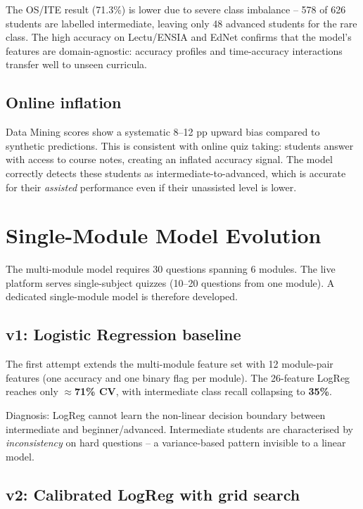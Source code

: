 \documentclass[12pt,a4paper]{article}
\begin{document}
The OS/ITE result (71.3\%) is lower due to severe class imbalance -- 578 of 626 students
are labelled intermediate, leaving only 48 advanced students for the rare class. The
high accuracy on Lectu/ENSIA and EdNet confirms that the model's features are
domain-agnostic: accuracy profiles and time-accuracy interactions transfer well
to unseen curricula.

\subsection{Online inflation}

Data Mining scores show a systematic 8--12 pp upward bias compared to synthetic
predictions. This is consistent with online quiz taking: students answer with access
to course notes, creating an inflated accuracy signal. The model correctly detects
these students as intermediate-to-advanced, which is accurate for their
\emph{assisted} performance even if their unassisted level is lower.

\section{Single-Module Model Evolution}
\label{sec:singlemodule}

The multi-module model requires 30 questions spanning 6 modules.
The live platform serves single-subject quizzes (10--20 questions from one module).
A dedicated single-module model is therefore developed.

\subsection{v1: Logistic Regression baseline}

The first attempt extends the multi-module feature set with 12 module-pair features
(one accuracy and one binary flag per module). The 26-feature LogReg reaches only
\textbf{$\approx$71\% CV}, with intermediate class recall collapsing to \textbf{35\%}.

Diagnosis: LogReg cannot learn the non-linear decision boundary between intermediate
and beginner/advanced. Intermediate students are characterised by \emph{inconsistency}
on hard questions -- a variance-based pattern invisible to a linear model.

\subsection{v2: Calibrated LogReg with grid search}
\end{document}
